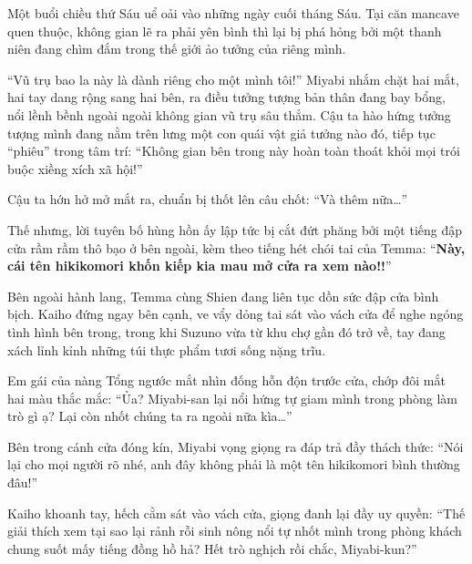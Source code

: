 \documentclass[../main.tex]{subfiles}
\begin{document}

Một buổi chiều thứ Sáu uể oải vào những ngày cuối tháng Sáu. Tại căn mancave quen thuộc, không gian lẽ ra phải yên bình thì lại bị phá hỏng bởi một thanh niên đang chìm đắm trong thế giới ảo tưởng của riêng mình.

``Vũ trụ bao la này là dành riêng cho một mình tôi!'' Miyabi nhắm chặt hai mắt, hai tay dang rộng sang hai bên, ra điều tưởng tượng bản thân đang bay bổng, nổi lềnh bềnh ngoài ngoài không gian vũ trụ sâu thẳm. Cậu ta hào hứng tưởng tượng mình đang nằm trên lưng một con quái vật giả tưởng nào đó, tiếp tục ``phiêu'' trong tâm trí: ``Không gian bên trong này hoàn toàn thoát khỏi mọi trói buộc xiềng xích xã hội!''


Cậu ta hớn hở mở mắt ra, chuẩn bị thốt lên câu chốt: ``Và thêm nữa\dots''

Thế nhưng, lời tuyên bố hùng hồn ấy lập tức bị cắt đứt phăng bởi một tiếng đập cửa rầm rầm thô bạo ở bên ngoài, kèm theo tiếng hét chói tai của Temma: ``\textbf{Này, cái tên hikikomori khốn kiếp kia mau mở cửa ra xem nào!!}''

Bên ngoài hành lang, Temma cùng Shien đang liên tục dồn sức đập cửa bình bịch. Kaiho đứng ngay bên cạnh, ve vẩy dỏng tai sát vào vách cửa để nghe ngóng tình hình bên trong, trong khi Suzuno vừa từ khu chợ gần đó trở về, tay đang xách lỉnh kỉnh những túi thực phẩm tươi sống nặng trĩu.


Em gái của nàng Tổng ngước mắt nhìn đống hỗn độn trước cửa, chớp đôi mắt hai màu thắc mắc: ``Ủa? Miyabi-san lại nổi hứng tự giam mình trong phòng làm trò gì ạ? Lại còn nhốt chúng ta ra ngoài nữa kìa\dots''

Bên trong cánh cửa đóng kín, Miyabi vọng giọng ra đáp trả đầy thách thức: ``Nói lại cho mọi người rõ nhé, anh đây không phải là một tên hikikomori bình thường đâu!''

Kaiho khoanh tay, hếch cằm sát vào vách cửa, giọng đanh lại đầy uy quyền: ``Thế giải thích xem tại sao lại rảnh rỗi sinh nông nổi tự nhốt mình trong phòng khách chung suốt mấy tiếng đồng hồ hả? Hết trò nghịch rồi chắc, Miyabi-kun?''
\end{document}
